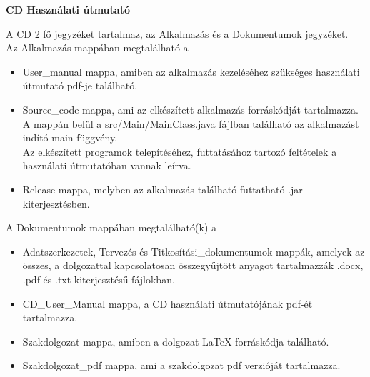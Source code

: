 
\pagestyle{empty}

\noindent \textbf{\Large CD Használati útmutató}

\vskip 1cm

\noindent A CD 2 fő jegyzéket tartalmaz, az Alkalmazás és a Dokumentumok jegyzéket.
\vspace{5pt} \\Az Alkalmazás mappában megtalálható a
\begin{itemize}
	\item User\_manual mappa, amiben az alkalmazás kezeléséhez szükséges használati útmutató pdf-je található.
	\item Source\_code mappa, ami az elkészített alkalmazás forráskódját tartalmazza. A mappán belül a src/Main/MainClass.java fájlban található az alkalmazást indító main függvény. 
	\\Az elkészített programok telepítéséhez, futtatásához tartozó feltételek a használati útmutatóban vannak leírva. 
	\item Release mappa, melyben az alkalmazás található futtatható .jar kiterjesztésben.
\end{itemize}
\vspace{5pt} A Dokumentumok mappában megtalálható(k) a
\begin{itemize}
	\item Adatszerkezetek, Tervezés és Titkosítási\_dokumentumok mappák, amelyek az összes, a dolgozattal kapcsolatosan összegyűjtött anyagot tartalmazzák .docx, .pdf és .txt kiterjesztésű fájlokban.
	\item CD\_User\_Manual mappa, a CD használati útmutatójának pdf-ét tartalmazza.
	\item Szakdolgozat mappa, amiben a dolgozat LaTeX forráskódja található.
	\item Szakdolgozat\_pdf mappa, ami a szakdolgozat pdf verzióját tartalmazza.
\end{itemize}

